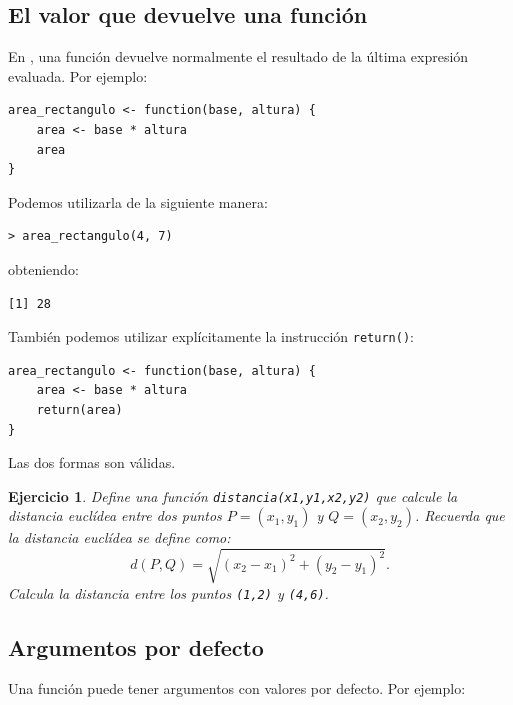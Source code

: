 \documentclass[11pt,a4paper]{article}
\newcommand{\R}{\textcolor{azuluc}{\faIcon{r-project}}}
\theoremstyle{exercise}
\newtheorem{exercise}{Ejercicio}
\begin{document}
\subsection{El valor que devuelve una función}

En \R, una función devuelve normalmente el resultado de la última expresión evaluada. Por ejemplo:

\begin{lstlisting}[style=rstyle]
area_rectangulo <- function(base, altura) {
	area <- base * altura
	area
}
\end{lstlisting}

\noindent Podemos utilizarla de la siguiente manera:

\begin{lstlisting}[style=rconsole]
> area_rectangulo(4, 7)
\end{lstlisting}

\noindent obteniendo:

\begin{lstlisting}[style=routput]
[1] 28
\end{lstlisting}

\noindent También podemos utilizar explícitamente la instrucción \texttt{return()}:

\begin{lstlisting}[style=rstyle]
area_rectangulo <- function(base, altura) {
	area <- base * altura
	return(area)
}
\end{lstlisting}

\noindent Las dos formas son válidas.

\begin{exercise}
Define una función \texttt{distancia(x1,y1,x2,y2)} que calcule la distancia euclídea entre dos puntos $P=(x_1,y_1)$ y $Q=(x_2,y_2)$. Recuerda que la distancia euclídea se define como:
\[
d(P,Q)=\sqrt{(x_2-x_1)^2+(y_2-y_1)^2}.
\]
\noindent Calcula la distancia entre los puntos \texttt{(1,2)} y \texttt{(4,6)}.
\end{exercise}

\subsection{Argumentos por defecto}

Una función puede tener argumentos con valores por defecto. Por ejemplo:
\end{document}

